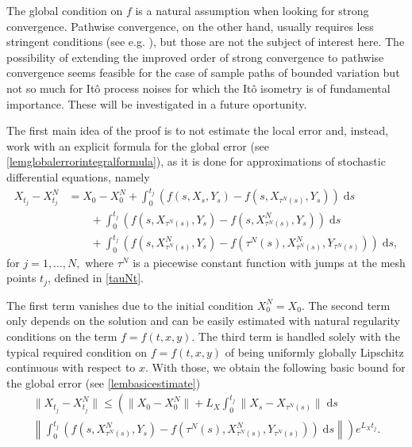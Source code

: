 \documentclass[reqno,12pt]{amsart}
\theoremstyle{plain} %
\theoremstyle{definition} %
\begin{document}
The global condition on $f$ is a natural assumption when looking for strong convergence. Pathwise convergence, on the other hand, usually requires less stringent conditions (see e.g. \cite{JentzenKloedenNeuenkirch2009, JentzenKloeden2011}), but those are not the subject of interest here. The possibility of extending the improved order of strong convergence to pathwise convergence seems feasible for the case of sample paths of bounded variation but not so much for It\^o process noises for which the It\^o isometry is of fundamental importance. These will be investigated in a future oportunity.

The first main idea of the proof is to not estimate the local error and, instead, work with an explicit formula for the global error (see \cref{lemglobalerrorintegralformula}), as it is done for approximations of stochastic differential equations, namely
\begin{equation}
    \label{lemglobalerrorintegralformulaintro}
    \begin{aligned}
        X_{t_j} - X_{t_j}^N & = X_0 - X_0^N + \int_0^{t_j} \left( f(s, X_s, Y_s) - f(s, X_{\tau^N(s)}, Y_s) \right)\;\mathrm{d}s  \\ 
        & \qquad + \int_{0}^{t_j} \left( f(s, X_{\tau^N(s)}, Y_s) - f(s, X_{\tau^N(s)}^N, Y_s) \right)\;\mathrm{d}s \\
        & \qquad + \int_0^{t_j} \left( f(s, X_{\tau^N(s)}^N, Y_s) - f(\tau^N(s), X_{\tau^N(s)}^N, Y_{\tau^N(s)}) \right)\;\mathrm{d}s,
    \end{aligned}
\end{equation}
for $j = 1, \ldots, N,$ where $\tau^N$ is a piecewise constant function with jumps at the mesh points $t_j$, defined in \eqref{tauNt}.

The first term vanishes due to the initial condition $X_0^N = X_0$. The second term only depends on the solution and can be easily estimated with natural regularity conditions on the term $f=f(t, x, y)$. The third term is handled solely with the typical required condition on $f=f(t, x, y)$ of being uniformly globally Lipschitz continuous with respect to $x$. With those, we obtain the following basic bound for the global error (see \cref{lembasicestimate})
\begin{multline}
    \label{Etjbasicboundintro}
        \|X_{t_j} - X_{t_j}^N\| \leq \left( \|X_0 - X_0^N\| + L_X \int_0^{t_j} \|X_s - X_{\tau^N(s)}\| \;\mathrm{d}s \right. \\
        \left. \left\|\int_0^{t_j} \left( f(s, X_{\tau^N(s)}^N, Y_s) - f(\tau^N(s), X_{\tau^N(s)}^N, Y_{\tau^N(s)}) \right)\;\mathrm{d}s\right\|\right) e^{L_X t_j}.
\end{multline}
\end{document}

